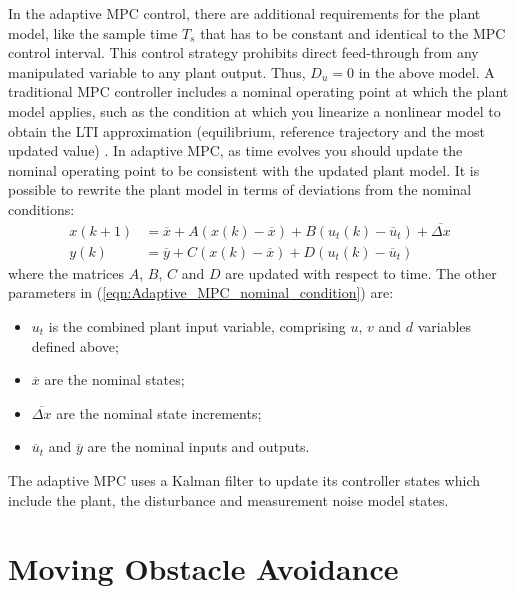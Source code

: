 \documentclass[conference, 11pt]{IEEEtran}
\begin{document}
In the adaptive MPC control, there are additional requirements for the plant model, like the sample time $T_s$ that has to be constant and identical to the MPC control interval. This control strategy prohibits direct feed-through from any manipulated variable to any plant output. Thus, $D_u = 0$ in the above model.
A traditional MPC controller includes a nominal operating point at which the plant model applies, such as the condition at which you linearize a nonlinear model to obtain the LTI approximation (equilibrium, reference trajectory and the	
most updated value) \cite{mpctoolbox}. In adaptive MPC, as time evolves you should update the nominal operating point to be consistent with the updated plant model. It is possible to rewrite the plant model in terms of deviations from the nominal conditions:
\begin{equation}
\label{eqn:Adaptive_MPC_nominal_condition}
\begin{aligned}
x(k+1)&=\overline{x}+A(x(k)-\overline{x})+ B(u_t(k)-\overline{u}_t)+\overline{\Delta x}\\
y(k)&=\overline{y}+C(x(k)-\overline{x}) + D(u_t(k)-\overline{u}_t)
\end{aligned}
\end{equation}
where the matrices $A$, $B$, $C$ and $D$ are updated with respect to time. The other parameters in (\ref{eqn:Adaptive_MPC_nominal_condition}) are:
\begin{itemize}
	\item $u_t$ is the combined plant input variable, comprising $u$, $v$ and $d$ variables defined above;
	\item $\overline{x}$ are the nominal states;
	\item $\overline{\Delta x}$ are the nominal state increments;
	\item $\overline{u}_t$ and $\overline{y}$ are the nominal inputs and outputs.
\end{itemize} 
The adaptive MPC uses a Kalman filter to update its controller states which include the plant, the disturbance and measurement noise model states.
\section{Moving Obstacle Avoidance}
\end{document}
